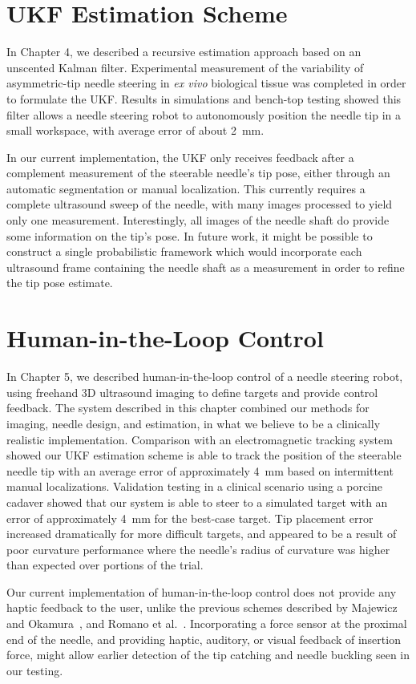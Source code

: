 \section{UKF Estimation Scheme}
In Chapter 4, we described a recursive estimation approach based on an unscented Kalman filter. Experimental measurement of the variability of asymmetric-tip needle steering in \textit{ex vivo} biological tissue was completed in order to formulate the UKF. Results in simulations and bench-top testing showed this filter allows a needle steering robot to autonomously position the needle tip in a small workspace, with average error of about 2~mm.

In our current implementation, the UKF only receives feedback after a complement measurement of the steerable needle's tip pose, either through an automatic segmentation or manual localization. This currently requires a complete ultrasound sweep of the needle, with many images processed to yield only one measurement. Interestingly, all images of the needle shaft do provide some information on the tip's pose. In future work, it might be possible to construct a single probabilistic framework which would incorporate each ultrasound frame containing the needle shaft as a measurement in order to refine the tip pose estimate.

\section{Human-in-the-Loop Control} 
In Chapter 5, we described human-in-the-loop control of a needle steering robot, using freehand 3D ultrasound imaging to define targets and provide control feedback. The system described in this chapter combined our methods for imaging, needle design, and estimation, in what we believe to be a clinically realistic implementation. Comparison with an electromagnetic tracking system showed our UKF estimation scheme is able to track the position of the steerable needle tip with an average error of approximately 4~mm based on intermittent manual localizations. Validation testing in a clinical scenario using a porcine cadaver showed that our system is able to steer to a simulated target with an error of approximately 4~mm for the best-case target. Tip placement error increased dramatically for more difficult targets, and appeared to be a result of poor curvature performance where the needle's radius of curvature was higher than expected over portions of the trial. 

Our current implementation of human-in-the-loop control does not provide any haptic feedback to the user, unlike the previous schemes described by Majewicz and Okamura~\cite{Majewicz2013}, and Romano et al.~\cite{Romano2007}. Incorporating a force sensor at the proximal end of the needle, and providing haptic, auditory, or visual feedback of insertion force, might allow earlier detection of the tip catching and needle buckling seen in our testing. 

